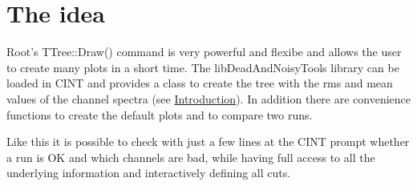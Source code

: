 \hypertarget{rootlib_Idea}{}\section{The idea}\label{rootlib_Idea}
Root's {\ttfamily TTree::Draw()} command is very powerful and flexibe and allows the user to create many plots in a short time. The libDeadAndNoisyTools library can be loaded in CINT and provides a class to create the tree with the rms and mean values of the channel spectra (see \hyperlink{index_Introduction}{Introduction}). In addition there are convenience functions to create the default plots and to compare two runs.

Like this it is possible to check with just a few lines at the CINT prompt whether a run is OK and which channels are bad, while having full access to all the underlying information and interactively defining all cuts.

